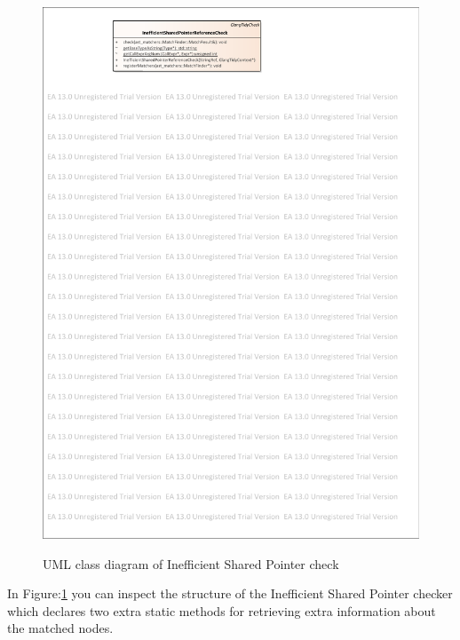 \begin{figure}[H]
	\caption{UML class diagram of Inefficient Shared Pointer check}
	\centering
	\includegraphics[scale=1.8]{images/InefficientSharedPtr.pdf}
	\label{shared_ptr_check}
\end{figure}
\par In Figure:\ref{shared_ptr_check} you can inspect the structure of the Inefficient Shared Pointer checker which declares two extra static methods for retrieving extra information about the matched nodes. 
